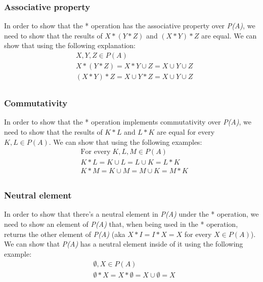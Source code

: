 \documentclass[12pt, oneside]{article}
\begin{document}
\subsubsection{Associative property}
In order to show that the * operation has the associative property over \emph{P(A)}, we need to show that the results of $X * (Y * Z)$ and $(X * Y) * Z$ are equal. We can show that using the following explanation:
\begin{equation*}
\begin{split}
& X, Y, Z \in P(A)\\
& X * (Y * Z) = X * Y \cup Z = X \cup Y \cup Z\\
& (X * Y) * Z = X \cup Y * Z = X \cup Y \cup Z\\
\end{split}
\end{equation*}

\subsubsection{Commutativity}
In order to show that the * operation implements commutativity over \emph{P(A)}, we need to show that the results of $K * L$ and $L * K$ are equal for every $K, L \in P(A)$. We can show that using the following examples:
\begin{equation*}
\begin{split}
& \text{For every}\;K, L, M \in P(A)\\
& K * L = K \cup L = L \cup K = L * K\\
& K * M = K \cup M = M \cup K = M * K\\
\end{split}
\end{equation*}
\clearpage

\subsubsection{Neutral element}
In order to show that there's a neutral element in \emph{P(A)} under the * operation, we need to show an element of \emph{P(A)} that, when being used in the * operation, returns the other element of \emph{P(A)} (aka $X * I = I * X = X$ for every $X \in P(A)$). We can show that \emph{P(A)} has a neutral element inside of it using the following example:
\begin{equation*}
\begin{split}
& \emptyset, X \in P(A)\\
& \emptyset * X = X * \emptyset = X \cup \emptyset = X
\end{split}
\end{equation*}
\end{document}
